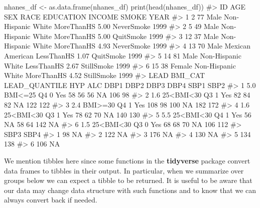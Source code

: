 \documentclass[
  letterpaper,
]{krantz}
\makeatletter
\newenvironment{Shaded}{\begin{snugshade}}{\end{snugshade}}
\newcommand{\CommentTok}[1]{\textcolor[rgb]{0.37,0.37,0.37}{#1}}
\newcommand{\FunctionTok}[1]{\textcolor[rgb]{0.28,0.35,0.67}{#1}}
\newcommand{\NormalTok}[1]{\textcolor[rgb]{0.00,0.23,0.31}{#1}}
\newcommand{\OtherTok}[1]{\textcolor[rgb]{0.00,0.23,0.31}{#1}}
\newenvironment{kframe}{%
\medskip{}
\setlength{\fboxsep}{.8em}
 \def\at@end@of@kframe{}%
 \ifinner\ifhmode%
  \def\at@end@of@kframe{\end{minipage}}%
  \begin{minipage}{\columnwidth}%
 \fi\fi%
 \def\FrameCommand##1{\hskip\@totalleftmargin \hskip-\fboxsep
 \colorbox{shadecolor}{##1}\hskip-\fboxsep
     \hskip-\linewidth \hskip-\@totalleftmargin \hskip\columnwidth}%
 \MakeFramed {\advance\hsize-\width
   \@totalleftmargin\z@ \linewidth\hsize
   \@setminipage}}%
 {\par\unskip\endMakeFramed%
 \at@end@of@kframe}
\renewenvironment{Shaded}{\begin{kframe}}{\end{kframe}}
\makeatother
\begin{document}
\begin{Shaded}
\begin{Highlighting}[]
\NormalTok{nhanes\_df }\OtherTok{\textless{}{-}} \FunctionTok{as.data.frame}\NormalTok{(nhanes\_df)}
\FunctionTok{print}\NormalTok{(}\FunctionTok{head}\NormalTok{(nhanes\_df))}
\CommentTok{\#\textgreater{}   ID AGE    SEX               RACE  EDUCATION INCOME      SMOKE YEAR}
\CommentTok{\#\textgreater{} 1  2  77   Male Non{-}Hispanic White MoreThanHS   5.00 NeverSmoke 1999}
\CommentTok{\#\textgreater{} 2  5  49   Male Non{-}Hispanic White MoreThanHS   5.00  QuitSmoke 1999}
\CommentTok{\#\textgreater{} 3 12  37   Male Non{-}Hispanic White MoreThanHS   4.93 NeverSmoke 1999}
\CommentTok{\#\textgreater{} 4 13  70   Male   Mexican American LessThanHS   1.07  QuitSmoke 1999}
\CommentTok{\#\textgreater{} 5 14  81   Male Non{-}Hispanic White LessThanHS   2.67 StillSmoke 1999}
\CommentTok{\#\textgreater{} 6 15  38 Female Non{-}Hispanic White MoreThanHS   4.52 StillSmoke 1999}
\CommentTok{\#\textgreater{}   LEAD   BMI\_CAT LEAD\_QUANTILE HYP ALC DBP1 DBP2 DBP3 DBP4 SBP1 SBP2}
\CommentTok{\#\textgreater{} 1  5.0   BMI\textless{}=25            Q4   0 Yes   58   56   56   NA  106   98}
\CommentTok{\#\textgreater{} 2  1.6 25\textless{}BMI\textless{}30            Q3   1 Yes   82   84   82   NA  122  122}
\CommentTok{\#\textgreater{} 3  2.4   BMI\textgreater{}=30            Q4   1 Yes  108   98  100   NA  182  172}
\CommentTok{\#\textgreater{} 4  1.6 25\textless{}BMI\textless{}30            Q3   1 Yes   78   62   70   NA  140  130}
\CommentTok{\#\textgreater{} 5  5.5 25\textless{}BMI\textless{}30            Q4   1 Yes   56   NA   58   64  142   NA}
\CommentTok{\#\textgreater{} 6  1.5 25\textless{}BMI\textless{}30            Q3   0 Yes   68   68   70   NA  106  112}
\CommentTok{\#\textgreater{}   SBP3 SBP4}
\CommentTok{\#\textgreater{} 1   98   NA}
\CommentTok{\#\textgreater{} 2  122   NA}
\CommentTok{\#\textgreater{} 3  176   NA}
\CommentTok{\#\textgreater{} 4  130   NA}
\CommentTok{\#\textgreater{} 5  134  138}
\CommentTok{\#\textgreater{} 6  106   NA}
\end{Highlighting}
\end{Shaded}

We mention tibbles here since some functions in the \textbf{tidyverse}
package convert data frames to tibbles in their output. In particular,
when we summarize over groups below we can expect a tibble to be
returned. It is useful to be aware that our data may change data
structure with such functions and to know that we can always convert
back if needed.
\end{document}
